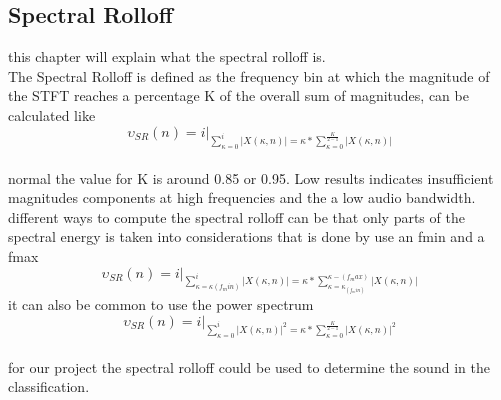 \subsection{Spectral Rolloff}
this chapter will explain what the spectral rolloff is.\\
The Spectral Rolloff is defined as the frequency bin at which the magnitude of the STFT reaches a percentage K of the overall sum of magnitudes, can be calculated like\citep{ACA}\\
\begin{equation}\label{ eq:normal spectral rolloff}
	\upsilon_{SR}(n) = i \vert _{\displaystyle\sum_{\kappa = 0}^i \vert X(\kappa, n) \vert = \kappa * \displaystyle\sum_{\kappa = 0}^ {\frac{K}{2-1}}\vert X(\kappa, n) \vert}
\end{equation}
\\
normal the value for K is around 0.85 or 0.95. Low results indicates insufficient magnitudes components at high frequencies and the a low audio bandwidth\citep{ACA}.\\
different ways to compute the spectral rolloff can be that only parts of the spectral energy is taken into considerations that is done by use an fmin and a fmax\citep{ACA}
\begin{equation}\label{ eq: fmin and fmax spectral rolloff}
	\upsilon_{SR}(n) = i \vert _{\displaystyle\sum_{\kappa = \kappa(f_min)}^i \vert X(\kappa, n) \vert = \kappa * \displaystyle\sum_{\kappa = \kappa_(f_min)}^ {\kappa-(f_max)}\vert X(\kappa, n) \vert}
\end{equation}
it can also be common to use the power spectrum
\begin{equation}\label{ eq:power spectral rolloff}
	\upsilon_{SR}(n) = i \vert _{\displaystyle\sum_{\kappa = 0}^i \vert X(\kappa, n) \vert^2 = \kappa * \displaystyle\sum_{\kappa = 0}^ {\frac{K}{2-1}}\vert X(\kappa, n) \vert^2}
\end{equation}
\\
for our project the spectral rolloff could be used to determine the sound in the classification. 

